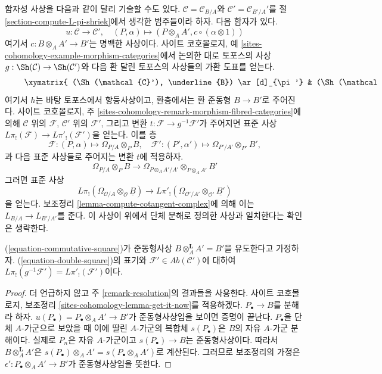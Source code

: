 \medskip\noindent
함자성 사상을 다음과 같이 달리 기술할 수도 있다. $\mathcal{C}=\mathcal{C}_{B/A}$와
$\mathcal{C}'=\mathcal{C}_{B'/A}'$를 절
\ref{section-compute-L-pi-shriek}에서 생각한 범주들이라 하자. 다음 함자가
있다.
$$
u : \mathcal{C} \longrightarrow \mathcal{C}',\quad
(P, \alpha) \longmapsto (P \otimes_A A', c \circ (\alpha \otimes 1))
$$
여기서 $c:B\otimes_AA'\to B'$는 명백한 사상이다. 사이트 코호몰로지,
예 \ref{sites-cohomology-example-morphism-categories}에서 논의한 대로
토포스의 사상 $g:\Sh(\mathcal{C})\to\Sh(\mathcal{C}')$와 다음 환 달린
토포스의 사상들의 가환 도표를 얻는다.
\begin{equation}
\label{equation-double-square}
\vcenter{
\xymatrix{
(\Sh(\mathcal{C}'), \underline{B}) \ar[d]_{\pi'} &
(\Sh(\mathcal{C}'), \underline{B'}) \ar[d]_{\pi'} \ar[l]^h &
(\Sh(\mathcal{C}), \underline{B'}) \ar[d]_\pi \ar[l]^g \\
(\Sh(*), B) &
(\Sh(*), B') \ar[l]_f &
(\Sh(*), B') \ar[l]
}
}
\end{equation}
여기서 $h$는 바탕 토포스에서 항등사상이고, 환층에서는 환 준동형
$B\to B'$로 주어진다. 사이트 코호몰로지, 주
\ref{sites-cohomology-remark-morphism-fibred-categories}에 의해
$\mathcal{C}$ 위의 $\mathcal{F}$, $\mathcal{C}'$ 위의 $\mathcal{F}'$,
그리고 변환 $t:\mathcal{F}\to g^{-1}\mathcal{F}'$가 주어지면 표준 사상
$L\pi_!(\mathcal{F})\to L\pi'_!(\mathcal{F}')$을 얻는다. 이를 층
$$
\mathcal{F} : (P, \alpha) \mapsto \Omega_{P/A} \otimes_P B,\quad
\mathcal{F}' : (P', \alpha') \mapsto \Omega_{P'/A'} \otimes_{P'} B',
$$
과 다음 표준 사상들로 주어지는 변환 $t$에 적용하자.
$$
\Omega_{P/A} \otimes_P B \longrightarrow
\Omega_{P \otimes_A A'/A'} \otimes_{P \otimes_A A'} B'
$$
그러면 표준 사상
$$
L\pi_!(\Omega_{\mathcal{O}/A} \otimes_\mathcal{O} \underline{B})
\longrightarrow
L\pi'_!(\Omega_{\mathcal{O}'/A'} \otimes_{\mathcal{O}'} \underline{B'})
$$
을 얻는다. 보조정리 \ref{lemma-compute-cotangent-complex}에 의해 이는
$L_{B/A}\to L_{B'/A'}$를 준다. 이 사상이 위에서 단체 분해로 정의한
사상과 일치한다는 확인은 생략한다.

\begin{lemma}
\label{lemma-flat-base-change}
(\ref{equation-commutative-square})가 준동형사상
$B\otimes_A^\mathbf{L}A'=B'$을 유도한다고 가정하자.
(\ref{equation-double-square})의 표기와
$\mathcal{F}'\in\textit{Ab}(\mathcal{C}')$에 대하여
$L\pi_!(g^{-1}\mathcal{F}')=L\pi'_!(\mathcal{F}')$이다.
\end{lemma}

\begin{proof}
더 언급하지 않고 주 \ref{remark-resolution}의 결과들을 사용한다. 사이트
코호몰로지, 보조정리 \ref{sites-cohomology-lemma-get-it-now}를 적용하겠다.
$P_\bullet\to B$를 분해라 하자.
$u(P_\bullet)=P_\bullet\otimes_AA'\to B'$가 준동형사상임을 보이면
증명이 끝난다. $P_\bullet$을 단체 $A$-가군으로 보았을 때 이에 딸린
$A$-가군의 복합체 $s(P_\bullet)$은 $B$의 자유 $A$-가군 분해이다. 실제로
$P_n$은 자유 $A$-가군이고 $s(P_\bullet)\to B$는 준동형사상이다. 따라서
$B\otimes_A^\mathbf{L}A'$은
$s(P_\bullet)\otimes_AA'=s(P_\bullet\otimes_AA')$로 계산된다. 그러므로
보조정리의 가정은
$\epsilon':P_\bullet\otimes_AA'\to B'$가 준동형사상임을 뜻한다.
\end{proof}

